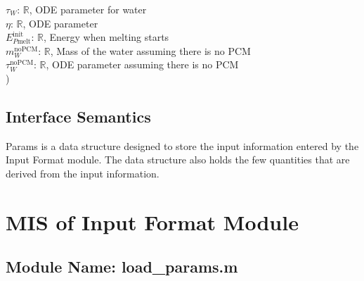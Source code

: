 \documentclass[12pt]{article}
\begin{document}
$\tau_W$: $\mathbb{R}$, ODE parameter for water\\
$\eta$: $\mathbb{R}$, ODE parameter\\
$E_{P\text{melt}}^{\text{init}}$: $\mathbb{R}$, Energy when melting starts\\
$m_W^\text{noPCM}$: $\mathbb{R}$, Mass of the water assuming there is no PCM\\
$\tau_W^{\text{noPCM}}$: $\mathbb{R}$, ODE parameter assuming there is no PCM\\
)


\subsection{Interface Semantics}

Params is a data structure designed to store the input information entered by
the Input Format module.  The data structure also holds the few quantities that
are derived from the input information.


\section{MIS of Input Format Module}

\subsection{Module Name: load\_{params}.m}


\end{document}
